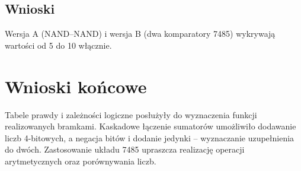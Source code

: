 \documentclass[12pt,a4paper]{article}
\begin{document}
\subsection{Wnioski}
Wersja A (NAND--NAND) i wersja B (dwa komparatory 7485) wykrywają wartości od 5 do 10 włącznie.
\section{Wnioski końcowe}
Tabele prawdy i zależności logiczne posłużyły do wyznaczenia funkcji realizowanych bramkami. Kaskadowe łączenie sumatorów umożliwiło dodawanie liczb 4-bitowych, a negacja bitów i dodanie jedynki -- wyznaczanie uzupełnienia do dwóch. Zastosowanie układu 7485 upraszcza realizację operacji arytmetycznych oraz porównywania liczb.
\end{document}
